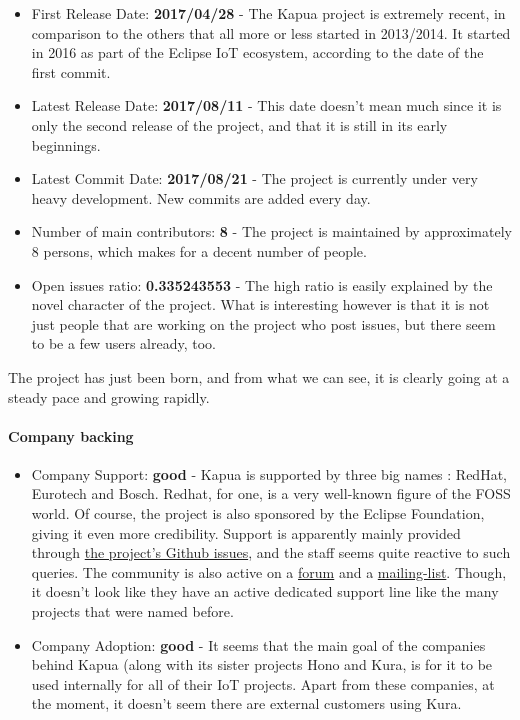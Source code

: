 \documentclass{article}
\begin{document}
\begin{itemize}
\item First Release Date: \textbf{2017/04/28} - The Kapua project is extremely recent, in comparison to the others that all more or less started in 2013/2014. It started in 2016 as part of the Eclipse IoT ecosystem, according to the date of the first commit.
\item Latest Release Date: \textbf{2017/08/11} - This date doesn't mean much since it is only the second release of the project, and that it is still in its early beginnings.
\item Latest Commit Date: \textbf{2017/08/21} - The project is currently under very heavy development. New commits are added every day.
\item Number of main contributors: \textbf{8} - The project is maintained by approximately 8 persons, which makes for a decent number of people.
\item Open issues ratio: \textbf{0.335243553} - The high ratio is easily explained by the novel character of the project. What is interesting however is that it is not just people that are working on the project who post issues, but there seem to be a few users already, too.
\end{itemize}

The project has just been born, and from what we can see, it is clearly going at a steady pace and growing rapidly.

\paragraph{Company backing}

\begin{itemize}
\item Company Support: \textbf{good} - Kapua is supported by three big names : RedHat, Eurotech and Bosch. Redhat, for one, is a very well-known figure of the FOSS world. Of course, the project is also sponsored by the Eclipse Foundation, giving it even more credibility. Support is apparently mainly provided through \href{https://github.com/eclipse/kapua/issues}{the project's Github issues}, and the staff seems quite reactive to such queries. The community is also active on a \href{https://www.eclipse.org/forums/index.php/f/340/}{forum} and a \href{https://dev.eclipse.org/mailman/listinfo/kapua-dev}{mailing-list}. Though, it doesn't look like they have an active dedicated support line like the many projects that were named before.
\item Company Adoption: \textbf{good} - It seems that the main goal of the companies behind Kapua (along with its sister projects Hono and Kura, is for it to be used internally for all of their IoT projects. Apart from these companies, at the moment, it doesn't seem there are external customers using Kura.
\end{itemize}
\end{document}
